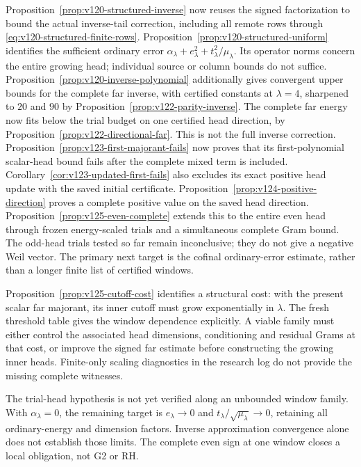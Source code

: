 \documentclass[11pt]{article}
\theoremstyle{remark}
\begin{document}
Proposition~\ref{prop:v120-structured-inverse} now reuses the signed
factorization to bound the actual inverse-tail correction, including
all remote rows through \eqref{eq:v120-structured-finite-rows}.
Proposition~\ref{prop:v120-structured-uniform} identifies the sufficient
ordinary error $\alpha_\lambda+e_\lambda^2+
 t_\lambda^2/\mu_\lambda$. Its operator norms concern the entire
growing head; individual source or column bounds do not suffice.
Proposition~\ref{prop:v120-inverse-polynomial} additionally gives
convergent upper bounds for the complete far inverse, with certified
constants at $\lambda=4$, sharpened to $20$ and $90$ by
Proposition~\ref{prop:v122-parity-inverse}. The complete far energy
now fits below the trial budget on one certified head direction,
by Proposition~\ref{prop:v122-directional-far}. This is not the full
inverse correction. Proposition~\ref{prop:v123-first-majorant-fails}
now proves that its first-polynomial scalar-head bound fails after
the complete mixed term is included. Corollary~\ref{cor:v123-updated-first-fails}
also excludes its exact positive head update with the saved initial
certificate. Proposition~\ref{prop:v124-positive-direction}
proves a complete positive value on the saved head direction.
Proposition~\ref{prop:v125-even-complete} extends this to the entire
even head through frozen energy-scaled trials and a simultaneous
complete Gram bound. The odd-head trials tested so far remain
inconclusive; they do not give a negative Weil vector. The primary
next target is the cofinal ordinary-error estimate, rather than a
longer finite list of certified windows.

Proposition~\ref{prop:v125-cutoff-cost} identifies a structural cost:
with the present scalar far majorant, its inner cutoff must grow
exponentially in $\lambda$. The fresh threshold table gives the
window dependence explicitly. A viable family must either control
the associated head dimensions, conditioning and residual Grams at
that cost, or improve the signed far estimate before constructing
the growing inner heads. Finite-only scaling diagnostics in the
research log do not provide the missing complete witnesses.

The trial-head hypothesis is not yet verified along an unbounded
window family. With $\alpha_\lambda=0$, the remaining target is
$e_\lambda\to0$ and $t_\lambda/\sqrt{\mu_\lambda}\to0$, retaining
all ordinary-energy and dimension factors. Inverse approximation
convergence alone does not establish those limits. The complete
even sign at one window closes a local obligation, not G2 or RH.
\end{document}
